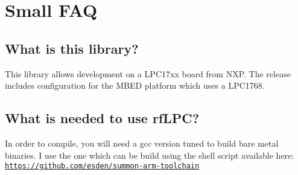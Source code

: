 \hypertarget{start_faq}{}\section{Small F\-A\-Q}\label{start_faq}
\hypertarget{start_description}{}\subsection{What is this library?}\label{start_description}
This library allows development on a L\-P\-C17xx board from N\-X\-P. The release includes configuration for the M\-B\-E\-D platform which uses a L\-P\-C1768.\hypertarget{start_needs}{}\subsection{What is needed to use rf\-L\-P\-C?}\label{start_needs}
In order to compile, you will need a gcc version tuned to build bare metal binaries. I use the one which can be build using the shell script available here\-: \href{https://github.com/esden/summon-arm-toolchain}{\tt https\-://github.\-com/esden/summon-\/arm-\/toolchain}

